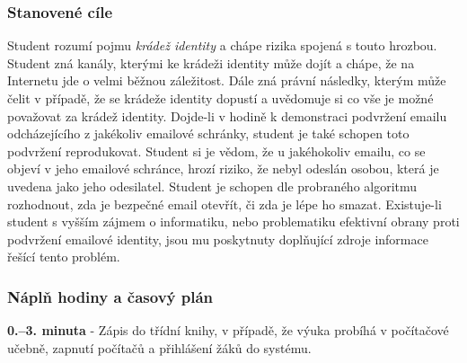 \documentclass[a4paper, 12pt]{article}
\begin{document}

\subsubsection{Stanovené cíle}
Student rozumí pojmu \textit{krádež identity} a chápe rizika spojená s touto hrozbou. Student zná kanály, kterými ke krádeži identity může dojít a chápe, že na Internetu jde o velmi běžnou záležitost. Dále zná právní následky, kterým může čelit v případě, že se krádeže identity dopustí a uvědomuje si co vše je možné považovat za krádež identity. Dojde-li v hodině k demonstraci podvržení emailu odcházejícího z jakékoliv emailové schránky, student je také schopen toto podvržení reprodukovat. Student si je vědom, že u jakéhokoliv emailu, co se objeví v jeho emailové schránce, hrozí riziko, že nebyl odeslán osobou, která je uvedena jako jeho odesilatel. Student je schopen dle probraného algoritmu rozhodnout, zda je bezpečné email otevřít, či zda je lépe ho smazat. Existuje-li student s vyšším zájmem o informatiku, nebo problematiku efektivní obrany proti podvržení emailové identity, jsou mu poskytnuty doplňující zdroje informace řešící tento problém.

\subsubsection{Náplň hodiny a časový plán}
\indent\textbf{0.--3. minuta} - Zápis do třídní knihy, v případě, že výuka probíhá v počítačové učebně, zapnutí počítačů a přihlášení žáků do systému.
\end{document}
